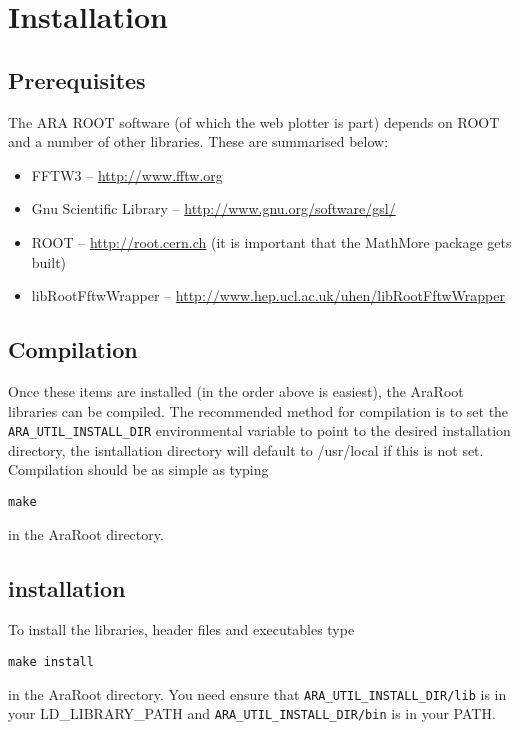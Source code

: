 \documentclass[letterpaper]{article}  %
\begin{document}
\section{Installation}
\subsection{Prerequisites}
The ARA ROOT software (of which the web plotter is part) depends on ROOT and a number of other libraries. These are summarised below:
\begin{itemize}
\item FFTW3 -- \url{http://www.fftw.org}
\item Gnu Scientific Library -- \url{http://www.gnu.org/software/gsl/}
\item ROOT -- \url{http://root.cern.ch} (it is important that the MathMore package gets built)
\item libRootFftwWrapper -- \url{http://www.hep.ucl.ac.uk/uhen/libRootFftwWrapper}
\end{itemize}

\subsection{Compilation}
Once these items are installed (in the order above is easiest), the AraRoot libraries can be compiled. The recommended method for compilation is to set the {\tt ARA\_UTIL\_INSTALL\_DIR} environmental variable to point to the desired installation directory, the isntallation directory will default to /usr/local if this is not set. Compilation should be as simple as typing \begin{verbatim}make\end{verbatim} in the AraRoot directory.

\subsection{installation}
To install the libraries, header files and executables type \begin{verbatim}make install\end{verbatim} in the AraRoot directory. You need ensure that {\tt ARA\_UTIL\_INSTALL\_DIR/lib} is in your LD\_LIBRARY\_PATH and {\tt ARA\_UTIL\_INSTALL\_DIR/bin} is in your PATH.
\end{document}
